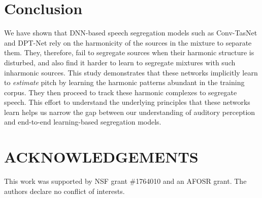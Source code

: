 \documentclass{article}
\begin{document}
\vspace*{-2mm}
\section{Conclusion}
\vspace*{-1mm}
We have shown that DNN-based speech segregation models such as Conv-TasNet and DPT-Net rely on the harmonicity of the sources in the mixture to separate them. They, therefore,  fail to segregate sources when their harmonic structure is disturbed, and also  find it harder to learn to segregate mixtures with such inharmonic sources. This study  demonstrates that these networks implicitly learn to \textit{estimate} pitch by learning the harmonic patterns abundant in the training corpus. They then proceed to track these harmonic complexes to segregate speech. This effort to understand the underlying principles that these networks learn helps us narrow the gap between our understanding of auditory perception and end-to-end learning-based segregation models. 

\vspace*{-1mm}
\section{ACKNOWLEDGEMENTS}
\label{sec:typestyle}
\vspace*{-2mm}
This work was supported by NSF grant \#1764010 and an AFOSR grant. The authors declare no conflict of interests.






\vfill\pagebreak







\end{document}
